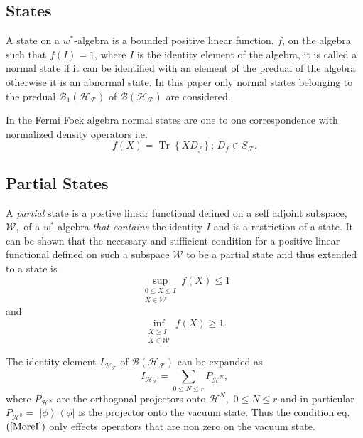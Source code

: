 \documentclass[aps,preprint]{revtex4}%
\begin{document}
\subsection{States \label{States}}

A state on a $w^{\ast}$-algebra is a bounded positive linear function, $f$, on
the algebra such that $f\left(  I\right)  =1$, where $I$ is the identity
element of the algebra, it is called a normal state if it can be identified
with an element of the predual of the algebra otherwise it is an abnormal
state. In this paper only normal states belonging to the predual
$\mathcal{B}_{1}\left(  \mathcal{H}_{\mathcal{F}}\right)  $ of $\mathcal{B}%
\left(  \mathcal{H}_{\mathcal{F}}\right)  $ are considered.

In the Fermi Fock algebra normal states are one to one correspondence with
normalized density operators i.e.
\begin{equation}
f\left(  X\right)  =\operatorname*{Tr}\left\{  XD_{f}\right\}  ;\,D_{f}\in
S_{\mathcal{F}}.
\end{equation}


\subsection{Partial States \label{Partial States}}

A \emph{partial} state is a postive linear functional defined on a self
adjoint subspace, $\mathcal{W},$ of a $w^{\ast}$-algebra \emph{that contains}
the identity $I$ and is a restriction of a state. It can be shown \cite{Emch,
Krein} that the necessary and sufficient condition for a positive linear
functional defined on such a subspace $\mathcal{W}$ to be a partial state and
thus extended to a state is
\begin{equation}
\sup_{\substack{0\leq X\leq I\\X\in\mathcal{W}}}f\left(  X\right)  \leq1
\label{LessI}%
\end{equation}
and%
\begin{equation}
\inf_{\substack{X\geq I\\X\in\mathcal{W}}}f\left(  X\right)  \geq1.
\label{MoreI}%
\end{equation}


The identity element $I_{\mathcal{H}_{\mathcal{F}}}$ of $\mathcal{B}\left(
\mathcal{H}_{\mathcal{F}}\right)  $ can be expanded as
\begin{equation}
I_{\mathcal{H}_{\mathcal{F}}}=\sum_{0\leq N\leq r}P_{\mathcal{H}^{N}},
\end{equation}
where $P_{\mathcal{H}^{N}}$ are the orthogonal projectors onto $\mathcal{H}%
^{N},$ $0\leq N\leq r$ and in particular $P_{\mathcal{H}^{0}}=$ $\left\vert
\phi\right\rangle \left\langle \phi\right\vert $ is the projector onto the
vacuum state. Thus the condition eq.$\left(  \ref{MoreI}\right)  $ only
effects operators that are non zero on the vacuum state.
\end{document}
